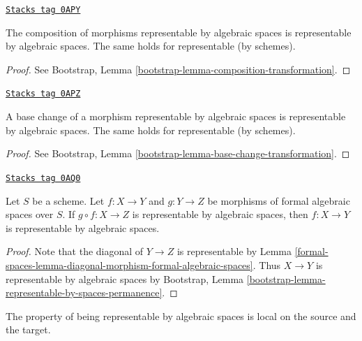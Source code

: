 \begin{lemma}
\label{formal-spaces-lemma-composition-representable}
\href{https://stacks.math.columbia.edu/tag/0APY}{\texttt{Stacks tag 0APY}}

The composition of morphisms representable by algebraic spaces is
representable by algebraic spaces. The same holds for representable
(by schemes).
\end{lemma}

\begin{proof}
See Bootstrap, Lemma \ref{bootstrap-lemma-composition-transformation}.
\end{proof}

\begin{lemma}
\label{formal-spaces-lemma-base-change-representable}
\href{https://stacks.math.columbia.edu/tag/0APZ}{\texttt{Stacks tag 0APZ}}

A base change of a morphism representable by algebraic spaces is
representable by algebraic spaces. The same holds for representable
(by schemes).
\end{lemma}

\begin{proof}
See Bootstrap, Lemma \ref{bootstrap-lemma-base-change-transformation}.
\end{proof}

\begin{lemma}
\label{formal-spaces-lemma-permanence-representable}
\href{https://stacks.math.columbia.edu/tag/0AQ0}{\texttt{Stacks tag 0AQ0}}

Let $S$ be a scheme. Let $f : X \to Y$ and $g : Y \to Z$ be morphisms of
formal algebraic spaces over $S$. If $g \circ f : X \to Z$ is representable
by algebraic spaces, then $f : X \to Y$ is representable by algebraic spaces.
\end{lemma}

\begin{proof}
Note that the diagonal of $Y \to Z$ is representable by
Lemma \ref{formal-spaces-lemma-diagonal-morphism-formal-algebraic-spaces}.
Thus $X \to Y$ is representable by algebraic spaces by
Bootstrap, Lemma \ref{bootstrap-lemma-representable-by-spaces-permanence}.
\end{proof}

The property of being representable by algebraic spaces is local on the
source and the target.

